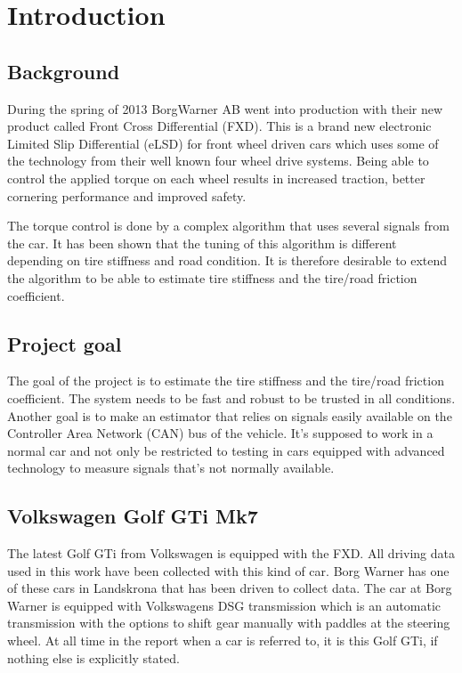 \chapter{Introduction}

\section{Background}
During the spring of 2013 BorgWarner AB went into production with their new product called Front Cross Differential (FXD). This is a brand new electronic Limited Slip Differential (eLSD) for front wheel driven cars which uses some of the technology from their well known four wheel drive systems. Being able to control the applied torque on each wheel results in increased traction, better cornering performance and improved safety.

The torque control is done by a complex algorithm that uses several signals from the car. It has been shown that the tuning of this algorithm is different depending on tire stiffness and road condition. It is therefore desirable to extend the algorithm to be able to estimate tire stiffness and the tire/road friction coefficient.

\section{Project goal}
The goal of the project is to estimate the tire stiffness and the tire/road friction coefficient. The system needs to be fast and robust to be trusted in all conditions. Another goal is to make an estimator that relies on signals easily available on the Controller Area Network (CAN) bus of the vehicle. It's supposed to work in a normal car and not only be restricted to testing in cars equipped with advanced technology to measure signals that's not normally available. 

\section{Volkswagen Golf GTi Mk7}
The latest Golf GTi from Volkswagen is equipped with the FXD. All driving data used in this work have been collected with this kind of car. Borg Warner has one of these cars in Landskrona that has been driven to collect data. The car at Borg Warner is equipped with Volkswagens DSG transmission which is an automatic transmission with the options to shift gear manually with paddles at the steering wheel. At all time in the report when a car is referred to, it is this Golf GTi, if nothing else is explicitly stated.

